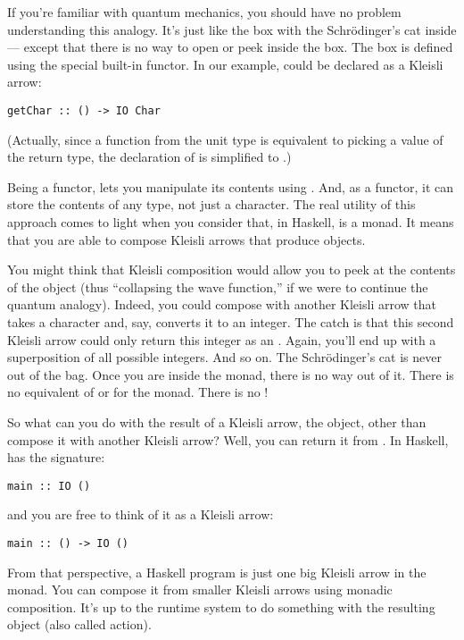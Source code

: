 If you're familiar with quantum mechanics, you should have no problem
understanding this analogy. It's just like the box with the
Schrödinger's cat inside --- except that there is no way to open or peek
inside the box. The box is defined using the special built-in
 functor. In our example,  could be declared
as a Kleisli arrow:

\begin{Verbatim}
getChar :: () -> IO Char
\end{Verbatim}
(Actually, since a function from the unit type is equivalent to picking
a value of the return type, the declaration of  is
simplified to .)

Being a functor,  lets you manipulate its contents using
. And, as a functor, it can store the contents of any type,
not just a character. The real utility of this approach comes to light
when you consider that, in Haskell,  is a monad. It means
that you are able to compose Kleisli arrows that produce 
objects.

You might think that Kleisli composition would allow you to peek at the
contents of the  object (thus ``collapsing the wave
function,'' if we were to continue the quantum analogy). Indeed, you
could compose  with another Kleisli arrow that takes a
character and, say, converts it to an integer. The catch is that this
second Kleisli arrow could only return this integer as an
. Again, you'll end up with a superposition of all
possible integers. And so on. The Schrödinger's cat is never out of the
bag. Once you are inside the  monad, there is no way out of
it. There is no equivalent of  or 
for the  monad. There is no !

So what can you do with the result of a Kleisli arrow, the 
object, other than compose it with another Kleisli arrow? Well, you can
return it from . In Haskell,  has the
signature:

\begin{Verbatim}
main :: IO ()
\end{Verbatim}
and you are free to think of it as a Kleisli arrow:

\begin{Verbatim}
main :: () -> IO ()
\end{Verbatim}
From that perspective, a Haskell program is just one big Kleisli arrow
in the  monad. You can compose it from smaller Kleisli arrows
using monadic composition. It's up to the runtime system to do something
with the resulting  object (also called  action).

